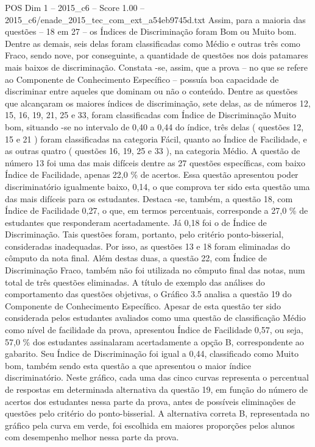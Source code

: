 \begin{textsample}{POS Dim 1 – 2015\_c6 – Score 1.00 – 2015\_c6/enade\_2015\_tec\_com\_ext\_a54eb9745d.txt}
Assim, para a maioria das questões – 18 em 27 – os Índices de Discriminação foram Bom ou Muito bom.
Dentre as demais, seis delas foram classificadas como Médio e outras três como Fraco, sendo nove, por conseguinte, a quantidade de questões nos dois patamares mais baixos de discriminação.
Constata -se, assim, que a prova – no que se refere ao Componente de Conhecimento Específico – possuía boa capacidade de discriminar entre aqueles que dominam ou não o conteúdo.
Dentre as questões que alcançaram os maiores índices de discriminação, sete delas, as de números 12, 15, 16, 19, 21, 25 e 33, foram classificadas com Índice de Discriminação Muito bom, situando -se no intervalo de 0,40 a 0,44 do índice, três delas ( questões 12, 15 e 21 ) foram classificadas na categoria Fácil, quanto ao Índice de Facilidade, e as outras quatro ( questões 16, 19, 25 e 33 ), na categoria Médio.
A questão de número 13 foi uma das mais difíceis dentre as 27 questões específicas, com baixo Índice de Facilidade, apenas 22,0 \% de acertos.
Essa questão apresentou poder discriminatório igualmente baixo, 0,14, o que comprova ter sido esta questão uma das mais difíceis para os estudantes.
Destaca -se, também, a questão 18, com Índice de Facilidade 0,27, o que, em termos percentuais, corresponde a 27,0 \% de estudantes que responderam acertadamente.
Já 0,18 foi o de Índice de Discriminação.
Tais questões foram, portanto, pelo critério ponto-bisserial, consideradas inadequadas.
Por isso, as questões 13 e 18 foram eliminadas do cômputo da nota final.
Além destas duas, a questão 22, com Índice de Discriminação Fraco, também não foi utilizada no cômputo final das notas, num total de três questões eliminadas.
A título de exemplo das análises do comportamento das questões objetivas, o Gráfico 3.5 analisa a questão 19 do Componente de Conhecimento Específico.
Apesar de esta questão ter sido considerada pelos estudantes avaliados como uma questão de classificação Médio como nível de facilidade da prova, apresentou Índice de Facilidade 0,57, ou seja, 57,0 \% dos estudantes assinalaram acertadamente a opção B, correspondente ao gabarito.
Seu Índice de Discriminação foi igual a 0,44, classificado como Muito bom, também sendo esta questão a que apresentou o maior índice discriminatório.
Neste gráfico, cada uma das cinco curvas representa o percentual de respostas em determinada alternativa da questão 19, em função do número de acertos dos estudantes nessa parte da prova, antes de possíveis eliminações de questões pelo critério do ponto-bisserial.
A alternativa correta B, representada no gráfico pela curva em verde, foi escolhida em maiores proporções pelos alunos com desempenho melhor nessa parte da prova.

\end{textsample}
